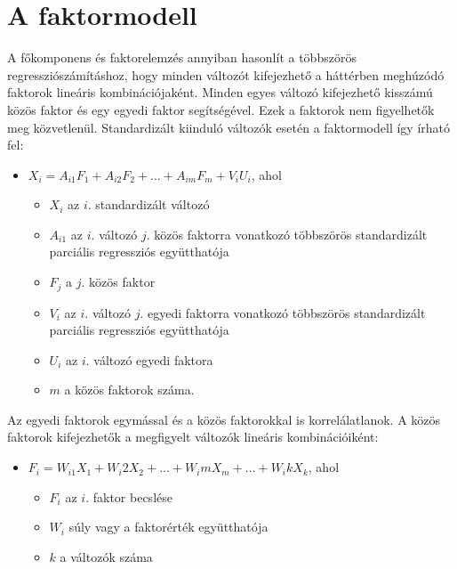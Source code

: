 \documentclass[
  letterpaper,
]{krantz}
\providecommand{\tightlist}{%
  \setlength{\itemsep}{0pt}\setlength{\parskip}{0pt}}\usepackage{longtable,booktabs,array}
\begin{document}
\hypertarget{a-faktormodell}{%
\section{A faktormodell}\label{a-faktormodell}}

A főkomponens és faktorelemzés annyiban hasonlít a többszörös
regressziószámításhoz, hogy minden változót kifejezhető a háttérben
meghúzódó faktorok lineáris kombinációjaként. Minden egyes változó
kifejezhető kisszámú közös faktor és egy egyedi faktor segítségével.
Ezek a faktorok nem figyelhetők meg közvetlenül. Standardizált kiinduló
változók esetén a faktormodell így írható fel:

\begin{itemize}
\item
  \(X_i=A_{i1} F_1+A_{i2} F_2+\dots+ A_{im} F_m+V_i U_i\), ahol

  \begin{itemize}
  \tightlist
  \item
    \(X_i\) az \(i.\) standardizált változó
  \item
    \(A_{i1}\) az \(i.\) változó \(j.\) közös faktorra vonatkozó
    többszörös standardizált parciális regressziós együtthatója
  \item
    \(F_j\) a \(j.\) közös faktor
  \item
    \(V_i\) az \(i.\) változó \(j.\) egyedi faktorra vonatkozó
    többszörös standardizált parciális regressziós együtthatója
  \item
    \(U_i\) az \(i.\) változó egyedi faktora
  \item
    \(m\) a közös faktorok száma.
  \end{itemize}
\end{itemize}

Az egyedi faktorok egymással és a közös faktorokkal is korrelálatlanok.
A közös faktorok kifejezhetők a megfigyelt változók lineáris
kombinációiként:

\begin{itemize}
\tightlist
\item
  \(F_i=W_{i1} X_1+W_i2 X_2+\dots+ W_im X_m+\dots+ W_ik X_k\), ahol

  \begin{itemize}
  \tightlist
  \item
    \(F_i\) az \(i.\) faktor becslése
  \item
    \(W_i\) súly vagy a faktorérték együtthatója
  \item
    \(k\) a változók száma
  \end{itemize}
\end{itemize}
\end{document}
